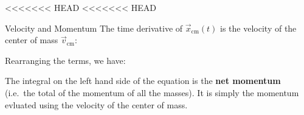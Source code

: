 \documentclass[12pt,compress,aspectratio=169]{beamer}
\begin{document}
<<<<<<< HEAD
<<<<<<< HEAD
\begin{frame}{Velocity and Momentum}
  The time derivative of $\vec x_\text{cm}(t)$ is the velocity of the center of
  mass $\vec v_\text{cm}$:
    

  Rearranging the terms, we have:


  The integral on the left hand side of the equation is the \textbf{net
    momentum} (i.e.\ the total of the momentum of all the masses). It is simply
  the momentum evluated using the velocity of the center of mass.
\end{frame}
\end{document}
